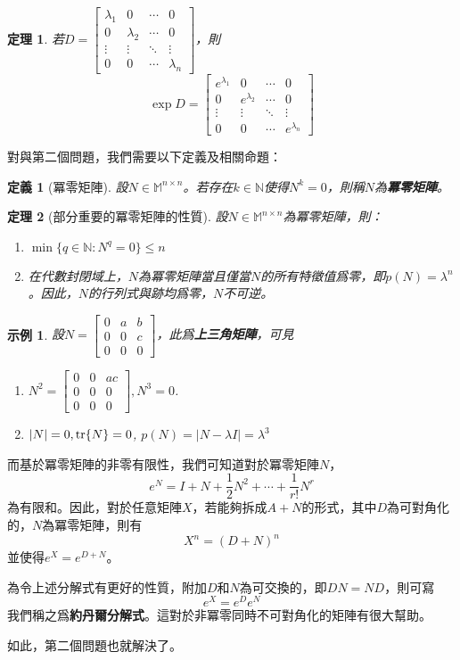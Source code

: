 \documentclass[12pt]{article}
\newtheorem{definition}{定義}
\newtheorem*{theorem}{定理}
\newtheorem*{example}{示例}
\begin{document}
    \begin{theorem}
        若$D=\begin{bmatrix}
            \lambda_1&0&\cdots&0\\
            0&\lambda_2&\cdots&0\\
            \vdots&\vdots&\ddots&\vdots\\
            0&0&\cdots&\lambda_n
        \end{bmatrix}$，則$$\exp{D}=\begin{bmatrix}
            e^{\lambda_1}&0&\cdots&0\\
            0&e^{\lambda_2}&\cdots&0\\
            \vdots&\vdots&\ddots&\vdots\\
            0&0&\cdots&e^{\lambda_n}
        \end{bmatrix}$$
    \end{theorem}

    對與第二個問題，我們需要以下定義及相關命題：

    \begin{definition}[冪零矩陣]
        設$N\in\mathbb{M}^{n\times n}$。若存在$k\in\mathbb{N}$使得$N^k=0$，則稱$N$為\textbf{冪零矩陣}。
    \end{definition}

    \begin{theorem}[部分重要的冪零矩陣的性質]
        設$N\in\mathbb{M}^{n\times n}$為冪零矩陣，則：\begin{enumerate}
            \item $\min\{q\in\mathbb{N}:N^q=0\}\leq n$
            \item 在代數封閉域上，$N$為冪零矩陣當且僅當$N$的所有特徵值爲零，即$p(N)=\lambda^n$。因此，$N$的行列式與跡均爲零，$N$不可逆。
        \end{enumerate}
    \end{theorem}

    \begin{example}
        設$N=\begin{bmatrix}
            0&a&b\\0&0&c\\0&0&0
        \end{bmatrix}$，此爲\textbf{上三角矩陣}，可見\begin{enumerate}
            \item $N^2=\begin{bmatrix}
                0&0&ac\\0&0&0\\0&0&0
            \end{bmatrix},N^3=0$.
            \item $|N|=0, \tr{N}=0$, $p(N)=|N-\lambda I|=\lambda^3$
        \end{enumerate}
    \end{example}

    而基於冪零矩陣的非零有限性，我們可知道對於冪零矩陣$N$，$$e^N=I+N+\frac{1}{2}N^2+\cdots+\frac{1}{r!}N^r$$為有限和。因此，對於任意矩陣$X$，若能夠拆成$A+N$的形式，其中$D$為可對角化的，$N$為冪零矩陣，則有$$X^n=(D+N)^n$$並使得$e^X=e^{D+N}$。

    為令上述分解式有更好的性質，附加$D$和$N$為可交換的，即$DN=ND$，則可寫$$e^X=e^De^N$$我們稱之爲\textbf{約丹爾分解式}。這對於非冪零同時不可對角化的矩陣有很大幫助。

    如此，第二個問題也就解決了。
\end{document}
